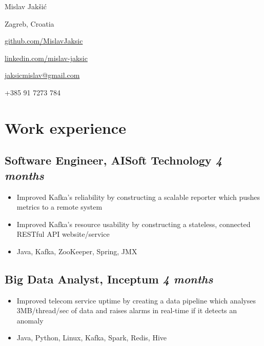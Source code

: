 \documentclass[a4paper]{article}
\newcommand{\bolditalicpair}
[2]
{\textbf{#1} \texorpdfstring{\hfill}{} \textit{#2}}
\begin{document}
\begin{multicols}{2}

\noindent
\begin{minipage}{.49\textwidth}
\raggedright

{\huge Mislav Jakšić}

Zagreb, Croatia
\end{minipage}

\noindent
\begin{minipage}{.49\textwidth}
\raggedleft

\href{https://github.com/MislavJaksic}{github.com/MislavJaksic}

\href{https://www.linkedin.com/in/mislav-jaksic}{linkedin.com/mislav-jaksic}

\href{mailto:jaksicmislav@gmail.com}{jaksicmislav@gmail.com}

+385 91 7273 784

\end{minipage}

\end{multicols}



\section{Work experience}
\subsection{\bolditalicpair{Software Engineer, AISoft Technology}{4 months}}

\begin{itemize}
  \item Improved Kafka's reliability by constructing a scalable reporter which pushes metrics to a remote system
  \item Improved Kafka's resource usability by constructing a stateless, connected RESTful API website/service
  \item Java, Kafka, ZooKeeper, Spring, JMX
\end{itemize}

\subsection{\bolditalicpair{Big Data Analyst, Inceptum}{4 months}}

\begin{itemize}
  \item Improved telecom service uptime by creating a data pipeline which analyses 3MB/thread/sec of data and raises alarms in real-time if it detects an anomaly
  \item Java, Python, Linux, Kafka, Spark, Redis, Hive
\end{itemize}
\end{document}
